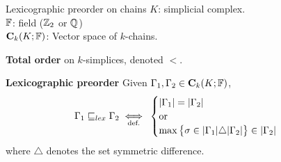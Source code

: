 %	
%	
%	
%	
%	
%	

\begin{frame}{Lexicographic preorder on chains}
	$K$: simplicial complex.\\
	$\mathbb{F}$: field ($\mathbb{Z}_2$ or $\mathbb{Q}$)\\
	$\mathbf{C}_k(K; \mathbb{F})$: Vector space of $k$-chains.
	
	\textbf{Total order} on $k$-simplices, denoted $<$.
	
	\textbf{Lexicographic preorder} Given $\Gamma_1, \Gamma_2 \in \mathbf{C}_k(K; \mathbb{F})$,
	\[
	\Gamma_1 \sqsubseteq_{lex} \Gamma_2 \underset{\text{def.}}{\iff} \:
	\begin{cases} 
		|\Gamma_1| = |\Gamma_2| \\
		\operatorname{or} \\
		\max \big\{ \sigma \in |\Gamma_1| \triangle |\Gamma_2|  \big\}  \in |\Gamma_2|
	\end{cases}
	\]
	where $\triangle$ denotes the set symmetric difference.
	
\end{frame}

